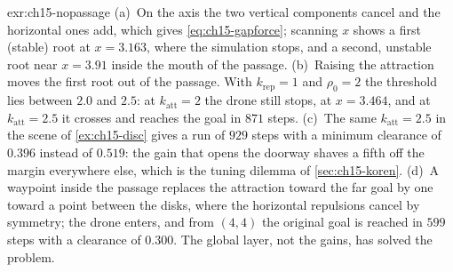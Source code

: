 \begin{solution}{exr:ch15-nopassage}
(a)~On the axis the two vertical components cancel and the horizontal ones add,
which gives \cref{eq:ch15-gapforce}; scanning $x$ shows a first (stable) root at
$x=3.163$, where the simulation stops, and a second, unstable root near
$x=3.91$ inside the mouth of the passage.
(b)~Raising the attraction moves the first root out of the passage. With
$k_{\mathrm{rep}}=1$ and $\rho_0=2$ the threshold lies between $2.0$ and $2.5$:
at $k_{\mathrm{att}}=2$ the drone still stops, at $x=3.464$, and at
$k_{\mathrm{att}}=2.5$ it crosses and reaches the goal in $871$ steps.
(c)~The same $k_{\mathrm{att}}=2.5$ in the scene of \cref{ex:ch15-disc} gives a run
of $929$ steps with a minimum clearance of $0.396$ instead of $0.519$: the gain
that opens the doorway shaves a fifth off the margin everywhere else, which is
the tuning dilemma of \cref{sec:ch15-koren}.
(d)~A waypoint inside the passage replaces the attraction toward the far goal by
one toward a point between the disks, where the horizontal repulsions cancel by
symmetry; the drone enters, and from $(4,4)$ the original goal is reached in
$599$ steps with a clearance of $0.300$. The global layer, not the gains, has
solved the problem.
\end{solution}
